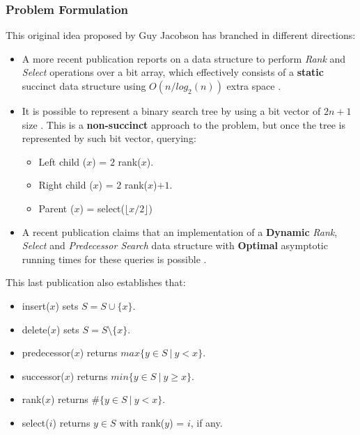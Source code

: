 \subsubsection*{Problem Formulation}
This original idea proposed by Guy Jacobson has branched in different directions:
\begin{itemize}
    \item A more recent publication reports on a data structure to perform \textit{Rank} and \textit{Select} operations over a bit array, which effectively consists of a \textbf{static} succinct data structure using $O(n/log_2(n))$ extra space \cite{gonzalez2005practical}.
    \item It is possible to represent a binary search tree by using a bit vector of $2n+1$ size \cite{munro2004succinct}. This is a \textbf{non-succinct} approach to the problem, but once the tree is represented by such bit vector, querying:
    \begin{itemize}
        \item Left child ($x$) = $2$ rank($x$).
        \item Right child ($x$) = $2$ rank($x$)$+1$.
        \item Parent ($x$) = select($\lfloor x/2 \rfloor$)
    \end{itemize}
    
    \item A recent publication claims that an implementation of a \textbf{Dynamic} \textit{Rank}, \textit{Select} and \textit{Predecessor Search} data structure with \textbf{Optimal} asymptotic running times for these queries is possible \cite{patrascu2014dynamic}.
\end{itemize}

This last publication also establishes that: 
\begin{itemize}
    \item insert($x$) sets $S=S \cup \{x\}$.
    \item delete($x$) sets $S=S \setminus \{x\}$.
    \item predecessor($x$) returns $max\{y\in S\ |\ y < x\}$.
    \item successor($x$) returns $min\{y\in S\ |\ y \geq x\}$.
    \item rank($x$) returns $\#\{y\in S\ |\ y < x\}$.
    \item select($i$) returns $y \in S$ with rank($y$) = $i$, if any.
\end{itemize}

